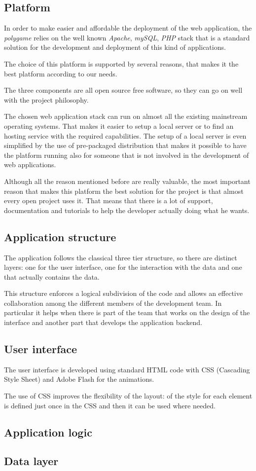 \subsection{Platform}
In order to make easier and affordable the deployment of the web application, the \emph{polygame} relies on the well known \emph{Apache}, \emph{mySQL}, \emph{PHP} stack that is a standard solution for the development and deployment of this kind of applications.

The choice of this platform is supported by several reasons, that makes it the best platform according to our needs.

The three components are all open source free software, so they can go on well with the project philosophy.

The chosen web application stack can run on almost all the existing mainstream operating systems. That makes it easier to setup a local server or to find an hosting service with the required capabilities. The setup of a local server is even simplified by the use of pre-packaged distribution that makes it possible to have the platform running also for someone that is not involved in the development of web applications.

Although all the reason mentioned before are really valuable, the most important reason that makes this platform the best solution for the project is that almost every open project uses it. That means that there is a lot of support, documentation and tutorials to help the developer actually doing what he wants.

\subsection{Application structure}
The application follows the classical three tier structure, so there are distinct layers: one for the user interface, one for the interaction with the data and one that actually contains the data.

This structure enforces a logical subdivision of the code and allows an effective collaboration among the different members of the development team. In particular it helps when there is part of the team that works on the design of the interface and another part that develops the application backend.
\subsection{User interface}
The user interface is developed using standard HTML code with CSS (Cascading Style Sheet) and Adobe Flash for the animations.

The use of CSS improves the flexibility of the layout: of the style for each element is defined just once in the CSS and then it can be used where needed.

\subsection{Application logic}
\subsection{Data layer}